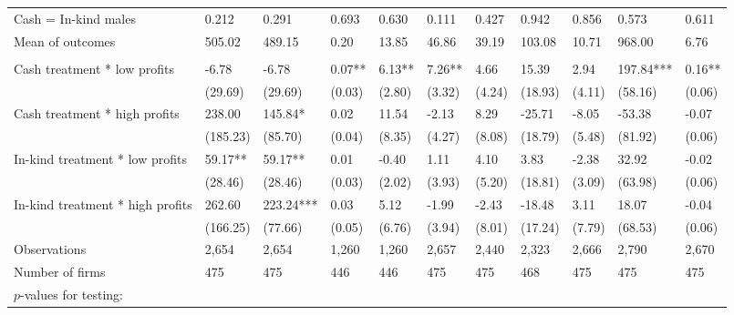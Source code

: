 \begin{table}[H]
{\begin{tabular}{lllllllllll}
\hspace{1em}\hspace{1em} Cash = In-kind males & 0.212 & 0.291 & 0.693 & 0.630 & 0.111 & 0.427 & 0.942 & 0.856 & 0.573 & 0.611\\
\hspace{1em}Mean of outcomes & 505.02 & 489.15 & 0.20 & 13.85 & 46.86 & 39.19 & 103.08 & 10.71 & 968.00 & 6.76\\
\addlinespace[0.3em]
\multicolumn{11}{l}{\textbf{Panel B: Female sub-sample}}\\
\hspace{1em}Cash treatment * low profits & -6.78 & -6.78 & 0.07** & 6.13** & 7.26** & 4.66 & 15.39 & 2.94 & 197.84*** & 0.16**\\
\hspace{1em} & (29.69) & (29.69) & (0.03) & (2.80) & (3.32) & (4.24) & (18.93) & (4.11) & (58.16) & (0.06)\\
\hspace{1em}Cash treatment * high profits & 238.00 & 145.84* & 0.02 & 11.54 & -2.13 & 8.29 & -25.71 & -8.05 & -53.38 & -0.07\\
\hspace{1em} & (185.23) & (85.70) & (0.04) & (8.35) & (4.27) & (8.08) & (18.79) & (5.48) & (81.92) & (0.06)\\
\hspace{1em}In-kind treatment * low profits & 59.17** & 59.17** & 0.01 & -0.40 & 1.11 & 4.10 & 3.83 & -2.38 & 32.92 & -0.02\\
\hspace{1em} & (28.46) & (28.46) & (0.03) & (2.02) & (3.93) & (5.20) & (18.81) & (3.09) & (63.98) & (0.06)\\
\hspace{1em}In-kind treatment * high profits & 262.60 & 223.24*** & 0.03 & 5.12 & -1.99 & -2.43 & -18.48 & 3.11 & 18.07 & -0.04\\
\hspace{1em} & (166.25) & (77.66) & (0.05) & (6.76) & (3.94) & (8.01) & (17.24) & (7.79) & (68.53) & (0.06)\\
\hspace{1em}Observations & 2,654 & 2,654 & 1,260 & 1,260 & 2,657 & 2,440 & 2,323 & 2,666 & 2,790 & 2,670\\
\hspace{1em}Number of firms & 475 & 475 & 446 & 446 & 475 & 475 & 468 & 475 & 475 & 475\\
\hspace{1em}$p$-values for testing: &  &  &  &  &  &  &  &  &  & \\

\end{tabular}}
\end{table}
